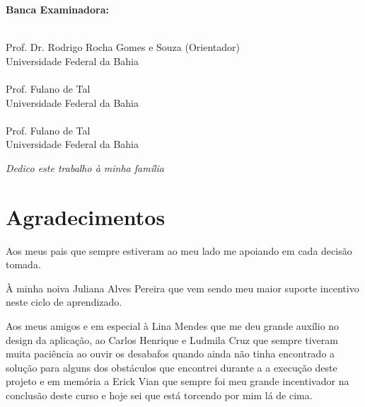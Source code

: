 \documentclass[12pt, a4paper]{report}
\begin{document}
\vspace{1.5cm}
\begin{center}
\Large \textbf{Banca Examinadora:}
\end{center}
\vspace{1cm}

\begin{flushright}
\begin{minipage}[l]{12cm}
\begin{center}
\uline{\hspace{10.5cm}} \\
Prof. Dr. Rodrigo Rocha Gomes e Souza (Orientador) \\ Universidade Federal da Bahia \\
\vspace{1cm}
\uline{\hspace{10.5cm}} \\
Prof. Fulano de Tal\\ Universidade Federal da Bahia \\
\vspace{1cm}
\uline{\hspace{10.5cm}} \\
Prof. Fulano de Tal \\ Universidade Federal da Bahia \\


\end{center}
\end{minipage}
\end{flushright}
\thispagestyle{empty} 

\newpage
\vspace*{21.9cm}
\begin{flushright}
\textit{Dedico este trabalho à minha família}
\end{flushright}
\thispagestyle{empty} 


\newpage
\chapter*{Agradecimentos}
\thispagestyle{empty}
Aos meus pais que sempre estiveram ao meu lado me apoiando em cada decisão tomada.

À minha noiva Juliana Alves Pereira que vem sendo meu maior suporte incentivo neste ciclo de aprendizado. 

Aos meus amigos e em especial à Lina Mendes que me deu grande auxílio no design da aplicação, ao Carlos Henrique e Ludmila Cruz que sempre tiveram muita paciência ao ouvir os desabafos quando ainda não tinha encontrado a solução para alguns dos obstáculos que encontrei durante a a execução deste projeto e em memória a Erick Vian que sempre foi meu grande incentivador na conclusão deste curso e hoje sei que está torcendo por mim lá de cima.
\end{document}
